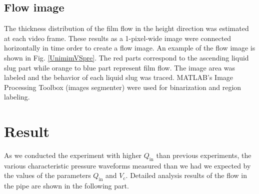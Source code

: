 \documentclass[aps,pre,preprint,groupedaddress,showkeys]{revtex4-2}
\begin{document}
\subsection{Flow image}\label{flowim}
The thickness distribution of the film flow in the height direction was estimated at each video frame.
These results as a 1-pixel-wide image were connected horizontally in time order to create a flow image.
An example of the flow image is shown in Fig. \ref{UnimimVSpre}. 
The red parts correspond to the ascending liquid slug part while orange to blue part represent film flow.
The image area was labeled and the behavior of each liquid slug was traced.
MATLAB's Image Processing Toolbox (images segmenter) were used for binarization and region labeling.




\section{Result}\label{res}
As we conducted the experiment with higher $Q_\mathrm{in}$ than previous experiments, the various characteristic pressure waveforms measured than we had we expected by the values of the parameters $Q_\mathrm{in}$ and $V_ \mathrm{c}$.
Detailed analysis results of the flow in the pipe are shown in the following part.
\end{document}
